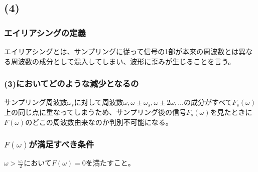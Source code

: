 \documentclass[a4paper,12pt,xelatex,ja=standard]{bxjsarticle}
\begin{document}
\subsection*{(4)}
\subsubsection*{エイリアシングの定義}
エイリアシングとは、サンプリングに従って信号の1部が本来の周波数とは異なる周波数の成分として混入してしまい、波形に歪みが生じることを言う。\\

\subsubsection*{(3)においてどのような減少となるの}
サンプリング周波数$\omega_s$に対して周波数$\omega, \omega \pm \omega_s, \omega \pm 2\omega, \dots$の成分がすべて$F_s(\omega)$上の同じ点に重なってしまうため、サンプリング後の信号$F_s(\omega)$を見たときに$F(\omega)$のどこの周波数由来なのか判別不可能になる。

\subsubsection*{$F(\omega)$が満足すべき条件}
$\omega > \frac{\omega_s}{2}$において$F(\omega) = 0$を満たすこと。
\end{document}
